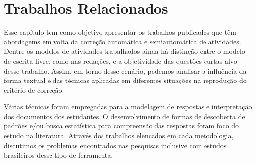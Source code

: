 
\chapter{Trabalhos Relacionados}\label{cap2}

Esse capítulo tem como objetivo apresentar os trabalhos publicados que têm abordagems em volta da correção automática e semiautomática de atividades. Dentre os modelos de atividades trabalhados ainda há distinção entre o modelo de escrita livre, como nas redações, e a objetividade das questões curtas alvo desse trabalho. Assim, em torno desse cenário, podemos analisar a influência da forma textual e das técnicas aplicadas em diferentes situações na reprodução do critério de correção.

Várias técnicas foram empregadas para a modelagem de respostas e interpretação dos documentos dos estudantes. O desenvolvimento de formas de descoberta de padrões e/ou busca estatística para compreensão das respostas foram foco do estudo na literatura. Através dos trabalhos elencados em cada metodologia, discutimos os problemas encontrados nas pesquisas inclusive com estudos brasileiros desse tipo de ferramenta. 


